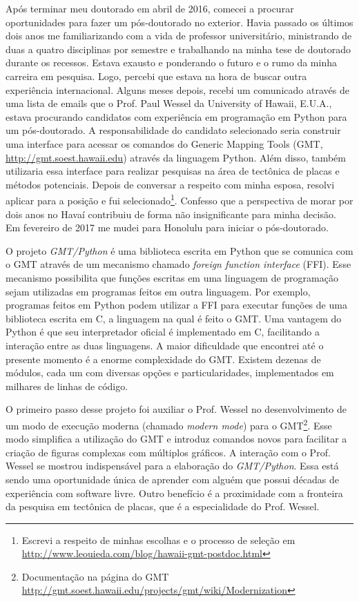 Após terminar meu doutorado em abril de 2016, comecei a procurar oportunidades
para fazer um pós-doutorado no exterior.
Havia passado os últimos dois anos me familiarizando com a vida de professor
universitário, ministrando de duas a quatro disciplinas por semestre e
trabalhando na minha tese de doutorado durante os recessos.
Estava exausto e ponderando o futuro e o rumo da minha carreira em pesquisa.
Logo, percebi que estava na hora de buscar outra experiência internacional.
Alguns meses depois, recebi um comunicado através de uma lista de emails que o
Prof. Paul Wessel da University of Hawaii, E.U.A., estava procurando candidatos
com experiência em programação em Python para um pós-doutorado.
A responsabilidade do candidato selecionado seria construir uma interface
para acessar os comandos do Generic Mapping Tools (GMT,
\url{http://gmt.soest.hawaii.edu}) através da linguagem Python.
Além disso, também utilizaria essa interface para realizar pesquisas na área de
tectônica de placas e métodos potenciais.
Depois de conversar a respeito com minha esposa, resolvi aplicar para a
posição e fui selecionado\footnote{Escrevi a respeito de minhas escolhas e o
processo de seleção em
\url{http://www.leouieda.com/blog/hawaii-gmt-postdoc.html}}.
Confesso que a perspectiva de morar por dois anos no Havaí contribuiu
de forma não insignificante para minha decisão.
Em fevereiro de 2017 me mudei para Honolulu para iniciar o pós-doutorado.

O projeto \textit{GMT/Python} é uma biblioteca escrita em Python que se
comunica com o GMT através de um mecanismo chamado \textit{foreign function
interface} (FFI).
Esse mecanismo possibilita que funções escritas em uma linguagem de programação
sejam utilizadas em programas feitos em outra linguagem.
Por exemplo, programas feitos em Python podem utilizar a FFI para executar
funções de uma biblioteca escrita em C, a linguagem na qual é feito o GMT.
Uma vantagem do Python é que seu interpretador oficial é implementado em C,
facilitando a interação entre as duas linguagens.
A maior dificuldade que encontrei até o presente momento é a enorme
complexidade do GMT.
Existem dezenas de módulos, cada um com diversas opções e particularidades,
implementados em milhares de linhas de código.

O primeiro passo desse projeto foi auxiliar o Prof. Wessel no desenvolvimento
de um modo de execução moderna (chamado \textit{modern mode}) para o
GMT\footnote{Documentação na página do GMT
\url{http://gmt.soest.hawaii.edu/projects/gmt/wiki/Modernization}}.
Esse modo simplifica a utilização do GMT e introduz comandos novos para
facilitar a criação de figuras complexas com múltiplos gráficos.
A interação com o Prof. Wessel se mostrou indispensável para a elaboração do
\textit{GMT/Python}.
Essa está sendo uma oportunidade única de aprender com alguém que possui
décadas de experiência com software livre.
Outro benefício é a proximidade com a fronteira da pesquisa em tectônica de
placas, que é a especialidade do Prof. Wessel.

